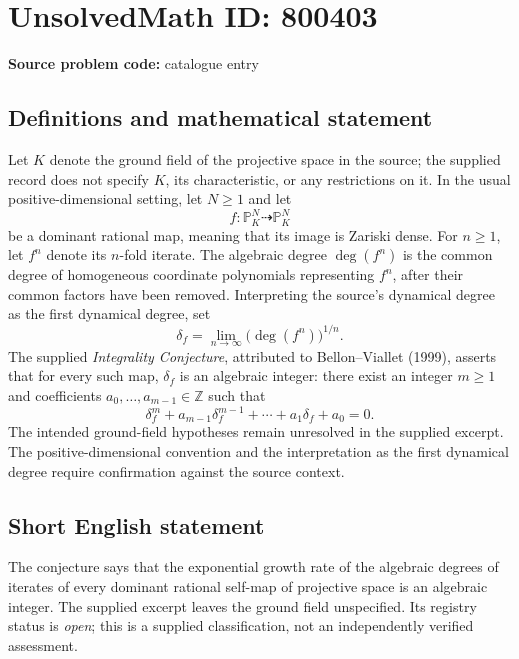 \documentclass[11pt]{article}
\newcommand{\Z}{\mathbb{Z}}
\newcommand{\PP}{\mathbb{P}}
\begin{document}
\section*{UnsolvedMath ID: 800403}
\textbf{Source problem code:} catalogue entry
\subsection{Definitions and mathematical statement}
Let \(K\) denote the ground field of the projective space in the source; the supplied record does not specify \(K\), its characteristic, or any restrictions on it. In the usual positive-dimensional setting, let \(N\geq 1\) and let
\[
f:\PP^N_K\dashrightarrow\PP^N_K
\]
be a dominant rational map, meaning that its image is Zariski dense. For \(n\geq 1\), let \(f^n\) denote its \(n\)-fold iterate. The algebraic degree \(\deg(f^n)\) is the common degree of homogeneous coordinate polynomials representing \(f^n\), after their common factors have been removed. Interpreting the source's dynamical degree as the first dynamical degree, set
\[
\delta_f=\lim_{n\to\infty}\bigl(\deg(f^n)\bigr)^{1/n}.
\]
The supplied \emph{Integrality Conjecture}, attributed to Bellon--Viallet (1999), asserts that for every such map, \(\delta_f\) is an algebraic integer: there exist an integer \(m\geq 1\) and coefficients \(a_0,\ldots,a_{m-1}\in\Z\) such that
\[
\delta_f^m+a_{m-1}\delta_f^{m-1}+\cdots+a_1\delta_f+a_0=0.
\]
The intended ground-field hypotheses remain unresolved in the supplied excerpt. The positive-dimensional convention and the interpretation as the first dynamical degree require confirmation against the source context.
\subsection{Short English statement}
The conjecture says that the exponential growth rate of the algebraic degrees of iterates of every dominant rational self-map of projective space is an algebraic integer. The supplied excerpt leaves the ground field unspecified. Its registry status is \emph{open}; this is a supplied classification, not an independently verified assessment.
\end{document}
